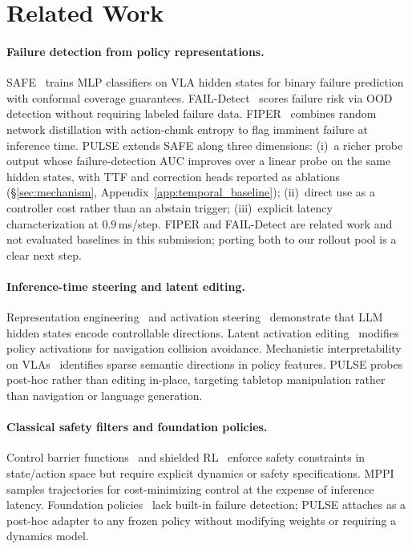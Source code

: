\section{Related Work}

\paragraph{Failure detection from policy representations.}
SAFE~\citep{safe_paper} trains MLP classifiers on VLA hidden states for binary failure prediction with conformal coverage guarantees. FAIL-Detect~\citep{fail_detect} scores failure risk via OOD detection without requiring labeled failure data. FIPER~\citep{fiper} combines random network distillation with action-chunk entropy to flag imminent failure at inference time. PULSE extends SAFE along three dimensions: (i)~a richer probe output whose failure-detection AUC improves over a linear probe on the same hidden states, with TTF and correction heads reported as ablations (\S\ref{sec:mechanism}, Appendix~\ref{app:temporal_baseline}); (ii)~direct use as a controller cost rather than an abstain trigger; (iii)~explicit latency characterization at $0.9$\,ms/step. FIPER and FAIL-Detect are related work and not evaluated baselines in this submission; porting both to our rollout pool is a clear next step.



\paragraph{Inference-time steering and latent editing.}
Representation engineering~\citep{repr_engineering} and activation steering~\citep{activation_steering} demonstrate that LLM hidden states encode controllable directions. Latent activation editing~\citep{lae_paper} modifies policy activations for navigation collision avoidance. Mechanistic interpretability on VLAs~\citep{mech_interp_vla} identifies sparse semantic directions in policy features. PULSE probes post-hoc rather than editing in-place, targeting tabletop manipulation rather than navigation or language generation.

\paragraph{Classical safety filters and foundation policies.}
Control barrier functions~\citep{cbf_paper} and shielded RL~\citep{shielded_rl} enforce safety constraints in state/action space but require explicit dynamics or safety specifications. MPPI~\citep{mppi_paper} samples trajectories for cost-minimizing control at the expense of inference latency. Foundation policies~\citep{openvla_paper, octo_paper, act_paper, dp_paper} lack built-in failure detection; PULSE attaches as a post-hoc adapter to any frozen policy without modifying weights or requiring a dynamics model.
